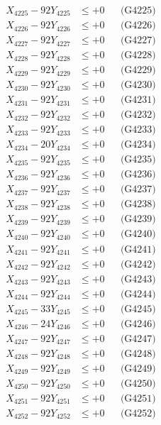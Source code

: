 \documentclass[a4paper,10pt]{article}
\begin{document}
{\begin{align}
X_{4225} - 92Y_{4225} &\leq +0 && \text{(G4225)} \\
X_{4226} - 92Y_{4226} &\leq +0 && \text{(G4226)} \\
X_{4227} - 92Y_{4227} &\leq +0 && \text{(G4227)} \\
X_{4228} - 92Y_{4228} &\leq +0 && \text{(G4228)} \\
X_{4229} - 92Y_{4229} &\leq +0 && \text{(G4229)} \\
X_{4230} - 92Y_{4230} &\leq +0 && \text{(G4230)} \\
\allowbreak
X_{4231} - 92Y_{4231} &\leq +0 && \text{(G4231)} \\
X_{4232} - 92Y_{4232} &\leq +0 && \text{(G4232)} \\
X_{4233} - 92Y_{4233} &\leq +0 && \text{(G4233)} \\
X_{4234} - 20Y_{4234} &\leq +0 && \text{(G4234)} \\
X_{4235} - 92Y_{4235} &\leq +0 && \text{(G4235)} \\
X_{4236} - 92Y_{4236} &\leq +0 && \text{(G4236)} \\
X_{4237} - 92Y_{4237} &\leq +0 && \text{(G4237)} \\
X_{4238} - 92Y_{4238} &\leq +0 && \text{(G4238)} \\
X_{4239} - 92Y_{4239} &\leq +0 && \text{(G4239)} \\
X_{4240} - 92Y_{4240} &\leq +0 && \text{(G4240)} \\
\allowbreak
X_{4241} - 92Y_{4241} &\leq +0 && \text{(G4241)} \\
X_{4242} - 92Y_{4242} &\leq +0 && \text{(G4242)} \\
X_{4243} - 92Y_{4243} &\leq +0 && \text{(G4243)} \\
X_{4244} - 92Y_{4244} &\leq +0 && \text{(G4244)} \\
X_{4245} - 33Y_{4245} &\leq +0 && \text{(G4245)} \\
X_{4246} - 24Y_{4246} &\leq +0 && \text{(G4246)} \\
X_{4247} - 92Y_{4247} &\leq +0 && \text{(G4247)} \\
X_{4248} - 92Y_{4248} &\leq +0 && \text{(G4248)} \\
X_{4249} - 92Y_{4249} &\leq +0 && \text{(G4249)} \\
X_{4250} - 92Y_{4250} &\leq +0 && \text{(G4250)} \\
\allowbreak
X_{4251} - 92Y_{4251} &\leq +0 && \text{(G4251)} \\
X_{4252} - 92Y_{4252} &\leq +0 && \text{(G4252)} \\

\end{align}}
\end{document}
